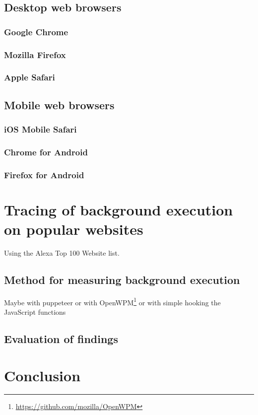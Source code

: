 \documentclass[article,type=bsc,colorback,accentcolor=tud9c]{tudthesis}
\begin{document}
  \subsection{Desktop web browsers}

  \subsubsection{Google Chrome}

  \subsubsection{Mozilla Firefox}

  \subsubsection{Apple Safari}

  \subsection{Mobile web browsers}

  \subsubsection{iOS Mobile Safari}

  \subsubsection{Chrome for Android}

  \subsubsection{Firefox for Android}

  \newpage
  \section{Tracing of background execution on popular websites}

  Using the Alexa Top 100 Website list.
  
  \subsection{Method for measuring background execution}

  Maybe with puppeteer or with OpenWPM\footnote{\url{https://github.com/mozilla/OpenWPM}} or with simple hooking the JavaScript functions
  
  \subsection{Evaluation of findings}

  
  \newpage
  \section{Conclusion}

  

  

   
\end{document}
